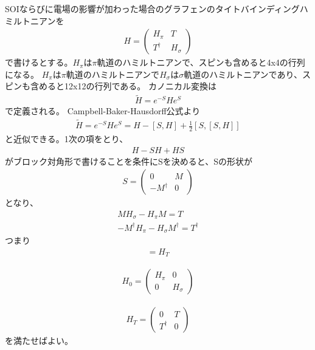 \documentclass{article}
\begin{document}
SOIならびに電場の影響が加わった場合のグラフェンのタイトバインディングハミルトニアンを
\begin{eqnarray}
H=\left( 
 \begin{array}{cc}
	H_\pi & T \\
	T^\dagger & H_\sigma
 \end{array}
\right)
\end{eqnarray}
で書けるとする。$H_\pi$は$\pi$軌道のハミルトニアンで、スピンも含めると4x4の行列になる。
$H_\pi$は$\pi$軌道のハミルトニアンで$H_\sigma$は$\sigma$軌道のハミルトニアンであり、スピンも含めると12x12の行列である。
カノニカル変換は
\begin{eqnarray}
\tilde{H}=e^{-S} H e^{S}
\end{eqnarray}
で定義される。
Campbell-Baker-Hausdorff公式より
\begin{eqnarray}
\tilde{H}=e^{-S} H e^{S}=H-[S,H]+\frac{1}{2}[S,[S,H]]
\label{CBH}
\end{eqnarray}
と近似できる。1次の項をとり、
\begin{eqnarray}
H-SH+HS
\end{eqnarray}
がブロック対角形で書けることを条件にSを決めると、Sの形状が
\begin{eqnarray}
S=\left( 
 \begin{array}{cc}
	0 & M \\
	-M^\dagger & 0
 \end{array}
\right)
\end{eqnarray}
となり、
\begin{eqnarray}
MH_\sigma -H_\pi M=T \label{M}\\
-M^\dagger H_\pi -H_\sigma M^\dagger=T^\dagger 
\end{eqnarray}
つまり
\begin{eqnarray}
[S, H_0]=H_T 
\end{eqnarray}

\begin{eqnarray}
H_0=\left( 
 \begin{array}{cc}
	H_\pi & 0 \\
	0 & H_\sigma
 \end{array}
\right)
\end{eqnarray}

\begin{eqnarray}
H_T=\left( 
 \begin{array}{cc}
	0 & T \\
	T^\dagger & 0
 \end{array}
\right)
\end{eqnarray}
を満たせばよい。
\end{document}
